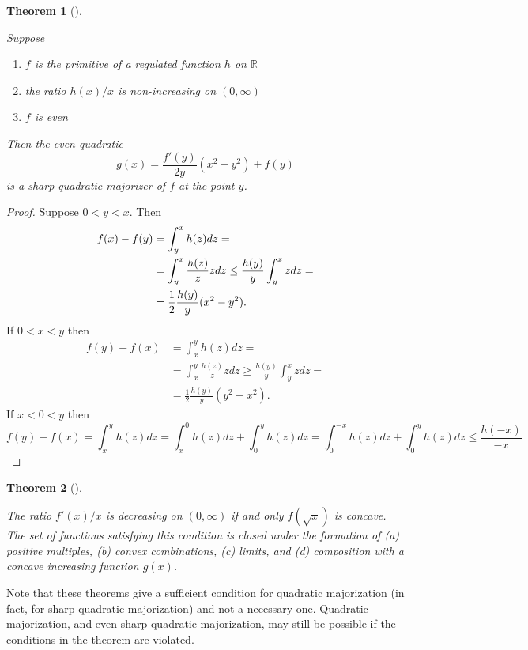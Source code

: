 \documentclass[
  12pt,
  letterpaper,
  DIV=11,
  numbers=noendperiod]{scrartcl}
\providecommand{\tightlist}{%
  \setlength{\itemsep}{0pt}\setlength{\parskip}{0pt}}\usepackage{longtable,booktabs,array}
\theoremstyle{definition}
\theoremstyle{plain}
\newtheorem{theorem}{Theorem}[section]
\theoremstyle{plain}
\theoremstyle{remark}
\begin{document}
\begin{theorem}[]\protect\hypertarget{thm-wght}{}\label{thm-wght}

Suppose

\begin{enumerate}
\def\labelenumi{\arabic{enumi}.}
\tightlist
\item
  \(f\) is the primitive of a regulated function \(h\) on \(\mathbb{R}\)
\item
  the ratio \(h(x)/x\) is non-increasing on \((0,\infty)\)
\item
  \(f\) is even
\end{enumerate}

Then the even quadratic \[
g(x)=\frac{f'(y)}{2y}(x^2-y^2)+f(y)\label{eq:sharp}
\] is a sharp quadratic majorizer of \(f\) at the point \(y\).

\end{theorem}

\begin{proof}
Suppose \(0<y<x\). Then \begin{align}
f(x)-f(y)&=\int_y^x h(z)dz=\notag\\
&=\int_y^x \frac{h(z)}{z}zdz\leq\frac{h(y)}{y}\int_y^xzdz=\notag\\
&=\frac12\frac{h(y)}{y}(x^2-y^2).
\end{align} If \(0<x<y\) then \begin{align}
f(y)-f(x)&=\int_x^y h(z)dz=\\
&=\int_x^y \frac{h(z)}{z}zdz\geq\frac{h(y)}{y}\int_y^xzdz=\\
&=\frac12\frac{h(y)}{y}(y^2-x^2).
\end{align} If \(x<0<y\) then \[
f(y)-f(x)=\int_x^y h(z)dz=
\int_x^0 h(z)dz+\int_0^y h(z)dz=
\int_0^{-x} h(z)dz+\int_0^y h(z)dz
\leq\frac{h(-x)}{-x}
\]
\end{proof}

\begin{theorem}[]\protect\hypertarget{thm-sqrt}{}\label{thm-sqrt}

The ratio \(f'(x)/x\) is decreasing on \((0,\infty)\) if and only
\(f(\sqrt{x})\) is concave. The set of functions satisfying this
condition is closed under the formation of (a) positive multiples, (b)
convex combinations, (c) limits, and (d) composition with a concave
increasing function \(g(x)\).

\end{theorem}

Note that these theorems give a sufficient condition for quadratic
majorization (in fact, for sharp quadratic majorization) and not a
necessary one. Quadratic majorization, and even sharp quadratic
majorization, may still be possible if the conditions in the theorem are
violated.
\end{document}
